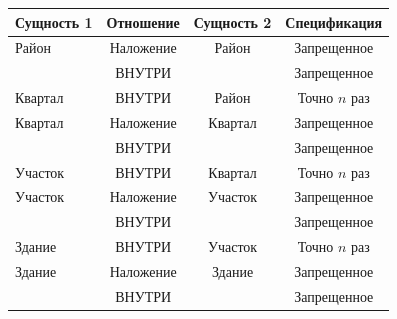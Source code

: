\begin{table}[b]\small


\begin{center}


\parbox{262pt}{





}





\vspace*{2ex}





    \begin{tabular}{|l|c|c|c|}


\hline


\multicolumn{1}{|c|}{Сущность 1}&Отношение & Сущность 2 


&Спецификация\\


\hline 


Район& Наложение & Район & Запрещенное \\


& ВНУТРИ && Запрещенное \\


\hline


Квартал &ВНУТРИ & Район & Точно $n$ раз \\


\hline


Квартал &Наложение& Квартал & Запрещенное\\ 


& ВНУТРИ &&Запрещенное \\


\hline


Участок& ВНУТРИ & Квартал & Точно $n$ раз \\


\hline


Участок & Наложение & Участок &Запрещенное \\


&ВНУТРИ &&Запрещенное \\


\hline


Здание &ВНУТРИ & Участок & Точно $n$ раз \\


\hline


Здание &Наложение & Здание & Запрещенное\\ 


&ВНУТРИ && Запрещенное \\


\hline


\end{tabular}


\end{center}


\end{table}



